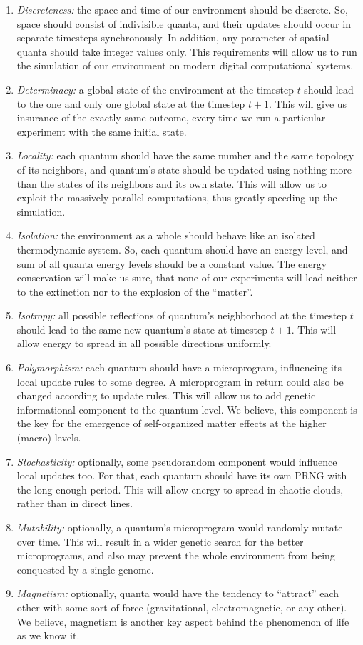 \documentclass[a4paper,12pt,tikz,UTF8]{article}
\begin{document}
\begin{enumerate}
\begin{enumerate}
        \item \textit{Discreteness:} the space and time of our environment should be discrete. So, space should consist of indivisible quanta, and their updates should occur in separate timesteps synchronously. In addition, any parameter of spatial quanta should take integer values only. This requirements will allow us to run the simulation of our environment on modern digital computational systems.
        \item \textit{Determinacy:} a global state of the environment at the timestep $t$ should lead to the one and only one global state at the timestep $t + 1$. This will give us insurance of the exactly same outcome, every time we run a particular experiment with the same initial state.
        \item \textit{Locality:} each quantum should have the same number and the same topology of its neighbors, and quantum's state should be updated using nothing more than the states of its neighbors and its own state. This will allow us to exploit the massively parallel computations, thus greatly speeding up the simulation.
        \item \label{itm:isolation} \textit{Isolation:} the environment as a whole should behave like an isolated thermodynamic system. So, each quantum should have an energy level, and sum of all quanta energy levels should be a constant value. The energy conservation will make us sure, that none of our experiments will lead neither to the extinction nor to the explosion of the ``matter''.
        \item \textit{Isotropy:} all possible reflections of quantum's neighborhood at the timestep $t$ should lead to the same new quantum's state at timestep $t + 1$. This will allow energy to spread in all possible directions uniformly. 
        \item \textit{Polymorphism:} each quantum should have a microprogram, influencing its local update rules to some degree. A microprogram in return could also be changed according to update rules. This will allow us to add genetic informational component to the quantum level. We believe, this component is the key for the emergence of self-organized matter effects at the higher (macro) levels.
        \item \textit{Stochasticity:} optionally, some pseudorandom component would influence local updates too. For that, each quantum should have its own PRNG with the long enough period. This will allow energy to spread in chaotic clouds, rather than in direct lines.
        \item \textit{Mutability:} optionally, a quantum's microprogram would randomly mutate over time. This will result in a wider genetic search for the better microprograms, and also may prevent the whole environment from being conquested by a single genome.
        \item \textit{Magnetism:} optionally, quanta would have the tendency to ``attract'' each other with some sort of force (gravitational, electromagnetic, or any other). We believe, magnetism is another key aspect behind the phenomenon of life as we know it.
      \end{enumerate}


\end{enumerate}
\end{document}
